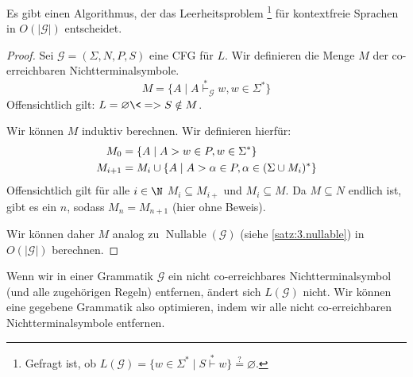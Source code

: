 \begin{Satz}[name={[Entscheidbarkeit des Leerheitsproblems für kontextfreie Sprachen]}] %
  \label{thm:cfl-decidable-emptyness}
    Es gibt einen Algorithmus, der das Leerheitsproblem%
    \footnote{Gefragt ist, ob $L(\mathcal{G}) = \{ w\in\Sigma^* \mid S\overset{*}{\vdash} w \} \overset{?}{=} \varnothing$.}
    für kontextfreie Sprachen in $O(|\mathcal{G}|)$ entscheidet.
\end{Satz}

\begin{proof}
    Sei $\mathcal{G} = (\Sigma, N, P, S)$ eine \ac{CFG} für $L$.
    Wir definieren die Menge $M$ der co-erreichbaren Nichtterminalsymbole.
    $$M = \{ A \mid A \stackrel{*}{\vdash}_\mathcal{G} w, w\in \Sigma^* \}$$
    Offensichtlich gilt: $L =\varnothing \<=> S\notin M$.
    
    Wir können $M$ induktiv berechnen. Wir definieren hierfür:
	\begin{align*}
		M_0 &= \{ A \mid A \-> w\in P, w\in \Sigma^* \}\\
		M_{i+1} &= M_i\cup \{ A \mid A \-> \alpha\in P, \alpha\in(\Sigma\cup M_i)^* \}
	\end{align*}
    Offensichtlich gilt für alle $i\in\N$ $M_i\subseteq M_{i+}$ und $M_i\subseteq M$.
    Da $M\subseteq N$ endlich ist, gibt es ein $n$, sodass $M_n = M_{n+1}$ (hier ohne Beweis).
    
    Wir können daher $M$ analog zu $\operatorname{Nullable}(\mathcal{G})$ (siehe \autoref{satz:3.nullable}) in $O(|\mathcal{G}|)$ berechnen.
\end{proof}
\begin{Bem}
        Wenn wir in einer Grammatik $\mathcal{G}$ ein nicht co-erreichbares Nichtterminalsymbol (und alle zugehörigen Regeln) entfernen, ändert sich $L(\mathcal{G})$ nicht.
        Wir können eine gegebene Grammatik also optimieren, indem wir alle nicht co-erreichbaren Nichtterminalsymbole entfernen.
\end{Bem}


